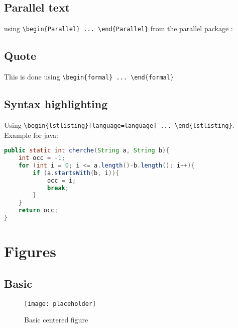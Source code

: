 \documentclass{customSynthesis}
\begin{document}
\subsection*{Parallel text}

using \verb|\begin{Parallel} ... \end{Parallel}| from the parallel package :

\begin{Parallel}[v]{0.48\textwidth}{0.48\textwidth}
\ParallelLText{
\lipsum[1][1]
}
\ParallelRText{
\lipsum[1][2]
}
\ParallelPar
\end{Parallel}

\subsection*{Quote}

\begin{formal}
This is done using \verb|\begin{formal} ... \end{formal}|
\end{formal}

\subsection*{Syntax highlighting}

Using \verb|\begin{lstlisting}[language=language] ... \end{lstlisting}|. Example for java:\\

\begin{lstlisting}[language=java]
public static int cherche(String a, String b){
    int occ = -1;
    for (int i = 0; i <= a.length()-b.length(); i++){
        if (a.startsWith(b, i)){
            occ = i;
            break;
        }
    }
    return occ;
}
\end{lstlisting}

\section*{Figures}

\subsection*{Basic}

\begin{figure}[H]
    \centering
    \texttt{[image: placeholder]}
    \caption{Basic centered figure}
\end{figure}
\end{document}
